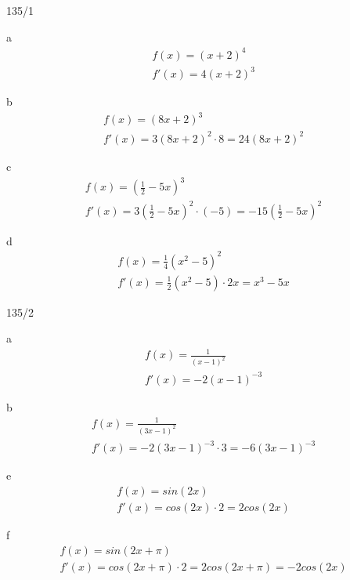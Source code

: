 \begin{exercise}{135/1}
  \item [a]
  \begin{gather*}
    f(x) = (x + 2)^4 \\
    f'(x) = 4(x + 2)^3
  \end{gather*}
  \item [b]
  \begin{gather*}
    f(x) = (8x + 2)^3 \\
    f'(x) = 3(8x + 2)^2 \cdot 8 = 24(8x + 2)^2
  \end{gather*}
  \item [c]
  \begin{gather*}
    f(x) = (\frac{1}{2} - 5x)^3 \\
    f'(x) = 3(\frac{1}{2} - 5x)^2 \cdot (-5) = -15(\frac{1}{2} - 5x)^2
  \end{gather*}
  \item [d]
  \begin{gather*}
    f(x) = \frac{1}{4}(x^2 - 5)^2 \\
    f'(x) = \frac{1}{2}(x^2 - 5) \cdot 2x = x^3 - 5x
  \end{gather*}
\end{exercise}
\begin{exercise}{135/2}
  \item [a]
  \begin{gather*}
    f(x) = \frac{1}{(x - 1)^2} \\
    f'(x) = -2(x - 1)^{-3}
  \end{gather*}
  \item [b]
  \begin{gather*}
    f(x) = \frac{1}{(3x - 1)^2} \\
    f'(x) = -2(3x - 1)^{-3} \cdot 3 = -6(3x - 1)^{-3}
  \end{gather*}
  \item [e]
  \begin{gather*}
    f(x) = sin(2x) \\
    f'(x) = cos(2x) \cdot 2 = 2cos(2x)
  \end{gather*}
  \item [f]
  \begin{gather*}
    f(x) = sin(2x + \pi) \\
    f'(x) = cos(2x + \pi) \cdot 2 = 2cos(2x + \pi) = -2cos(2x)
  \end{gather*}
\end{exercise}
